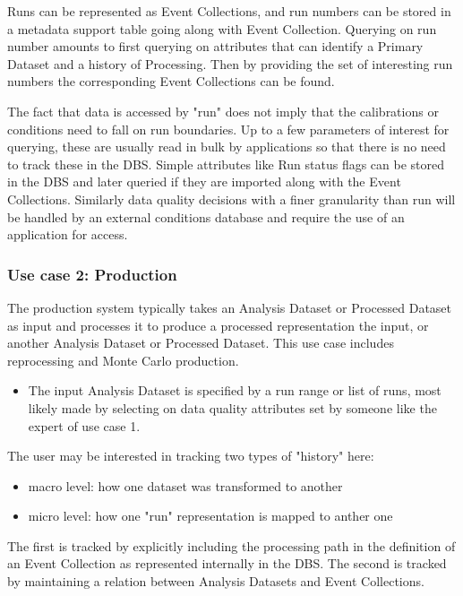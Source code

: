 \documentclass{cmspaper}
\begin{document}
Runs can be represented as Event Collections, and run numbers can be stored 
in a metadata support table going along with Event Collection.  Querying on 
run number amounts to first querying on attributes that can identify a 
Primary Dataset and a history of Processing.  Then by providing the set of 
interesting run numbers the corresponding Event Collections can be found.

The fact that data is accessed by "run" does not imply that the 
calibrations or conditions need to fall on run boundaries.  Up to a few 
parameters of interest for querying, these are usually 
read in bulk by applications so that there is no need to track these in the 
DBS.    Simple attributes like Run status flags 
can be stored in the DBS and later queried 
if they are imported along with the Event Collections.
Similarly data quality decisions with a finer granularity than 
run will be handled by an external conditions database and require 
the use of an application for access. 

\subsubsection{Use case 2: Production}
\label{sec:UCprod}

  The production system typically takes an Analysis Dataset or Processed Dataset
as input and processes it to produce a processed representation the input, or 
another Analysis Dataset or Processed Dataset. This use case includes reprocessing
and Monte Carlo production.


\begin{itemize}
\item The input Analysis Dataset is specified by a run range or list
     of runs, most likely made by selecting on data quality attributes set by
     someone like the expert of use case 1.  
\end{itemize}

The user may be interested in tracking two types of "history" here:
\begin{itemize}
      \item macro level: how one dataset was transformed to another
      \item micro level: how one "run" representation is mapped to anther one
\end{itemize}
The first is tracked by explicitly including the processing path in the
definition of an Event Collection as represented internally in the DBS.  
The second is tracked by maintaining a relation between Analysis Datasets
and Event Collections.
\end{document}
